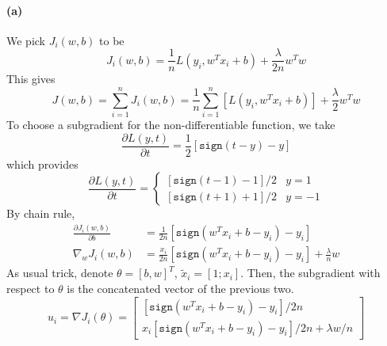 \documentclass[12pt]{article}
\begin{document}
\paragraph{(a)}
We pick \(J_i(w,b)\) to be
\[ J_i(w,b)=\frac{1}{n}L(y_i,w^T x_i+b)+\frac{\lambda}{2n} w^T w \]
This gives
\[ J(w,b)=\sum_{i=1}^{n}J_i(w,b)=\frac{1}{n}\sum_{i=1}^{n}\left[L(y_i,w^T x_i+b) \right] +\frac{\lambda}{2}w^T w \]
To choose a subgradient for the non-differentiable function, we take
\[ \frac{\partial L(y,t)}{\partial t}=\frac{1}{2}\left[\mathtt{sign}(t-y)-y \right] \]
which provides
\[ \frac{\partial L(y,t)}{\partial t}=\begin{cases} [\mathtt{sign}(t-1)-1]/2 & y=1 \\ [\mathtt{sign}(t+1)+1]/2 & y=-1 \end{cases} \]
By chain rule,
\begin{align*}
    \frac{\partial{J_i(w,b)}}{\partial b}&=\frac{1}{2n}[\mathtt{sign}(w^T x_i+b-y_i)-y_i] \\
    \nabla_w J_i(w,b)&=\frac{x_i}{2n}[\mathtt{sign}(w^T x_i+b-y_i)-y_i]+\frac{\lambda}{n}w
\end{align*}
As usual trick, denote  \(\theta=[b, w]^T\), \(\tilde{x}_i=[1; x_i]\).
Then, the subgradient with respect to \(\theta\) is the concatenated vector of the previous two.
\[ u_i= \nabla J_i(\theta)=\begin{bmatrix}[\mathtt{sign}(w^T x_i+b-y_i)-y_i]/2n \\ x_i[\mathtt{sign}(w^T x_i+b-y_i)-y_i]/2n+\lambda w/n \end{bmatrix} \]
\end{document}
